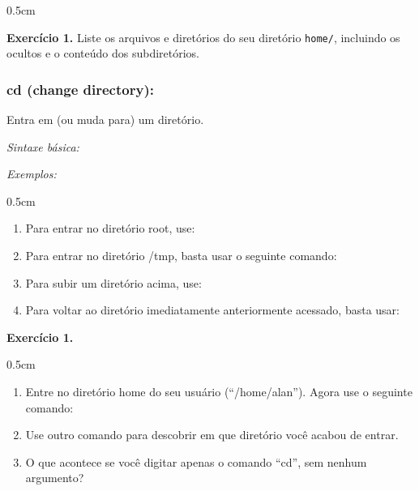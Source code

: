 \begin{refsection}
\begin {myindentpar}{0.5cm}
\begin{enumerate}[\itshape i.]
\begin{blackBlock}{\textbf{Exercício 1.}}
Liste os arquivos e diretórios do seu diretório \texttt{home/}, incluindo os ocultos e o conteúdo dos subdiretórios.

\end{blackBlock}

\end{enumerate}
\end{myindentpar}


\subsubsection{cd (change directory):}\label{tut1:text_mode:commands:cd}

Entra em (ou muda para) um diretório.

\textit{Sintaxe básica:}


\textit{Exemplos:}
\begin {myindentpar}{0.5cm}
\begin{enumerate}[\itshape i.]

\item{Para entrar no diretório root, use:}

\item{Para entrar no diretório /tmp, basta usar o seguinte comando:}

\item{Para subir um diretório acima, use:}

\item{Para voltar ao diretório imediatamente anteriormente acessado, basta usar:}


\end{enumerate}
\end{myindentpar}

\begin{blackBlock}{\textbf{Exercício 1.}}\label{tut1:ex:1.\arabic{ex}}

\begin {myindentpar}{0.5cm}
\begin{enumerate}[\itshape i.]

\item{Entre no diretório home do seu usuário (``/home/alan''). Agora use o seguinte comando:}


\item{Use outro comando para descobrir em que diretório você acabou de entrar.}\\
\item{O que acontece se você digitar apenas o comando ``cd'', sem nenhum argumento?}\\


\end{enumerate}
\end{myindentpar}
\end{blackBlock}
\end{refsection}
